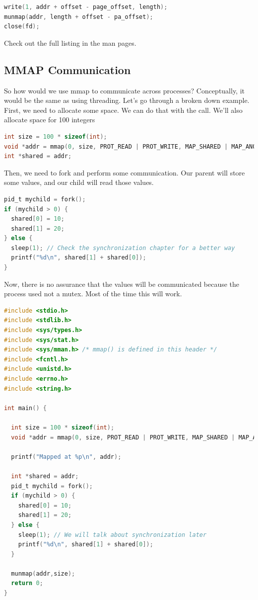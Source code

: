\begin{lstlisting}[language=C]
write(1, addr + offset - page_offset, length);
munmap(addr, length + offset - pa_offset);
close(fd);
\end{lstlisting}

Check out the full listing in the man pages.

\subsection{MMAP Communication}

So how would we use mmap to communicate across processes?
Conceptually, it would be the same as using threading.
Let's go through a broken down example.
First, we need to allocate some space.
We can do that with the  call.
We'll also allocate space for 100 integers

\begin{lstlisting}[language=C]
int size = 100 * sizeof(int);
void *addr = mmap(0, size, PROT_READ | PROT_WRITE, MAP_SHARED | MAP_ANONYMOUS, -1, 0);
int *shared = addr;
\end{lstlisting}

Then, we need to fork and perform some communication.
Our parent will store some values, and our child will read those values.

\begin{lstlisting}[language=C]
pid_t mychild = fork();
if (mychild > 0) {
  shared[0] = 10;
  shared[1] = 20;
} else {
  sleep(1); // Check the synchronization chapter for a better way
  printf("%d\n", shared[1] + shared[0]);
}
\end{lstlisting}

Now, there is no assurance that the values will be communicated because the process used  not a mutex.
Most of the time this will work.

\begin{lstlisting}[language=C]
#include <stdio.h>
#include <stdlib.h>
#include <sys/types.h>
#include <sys/stat.h>
#include <sys/mman.h> /* mmap() is defined in this header */
#include <fcntl.h>
#include <unistd.h>
#include <errno.h>
#include <string.h>

int main() {

  int size = 100 * sizeof(int);
  void *addr = mmap(0, size, PROT_READ | PROT_WRITE, MAP_SHARED | MAP_ANONYMOUS, -1, 0);

  printf("Mapped at %p\n", addr);

  int *shared = addr;
  pid_t mychild = fork();
  if (mychild > 0) {
    shared[0] = 10;
    shared[1] = 20;
  } else {
    sleep(1); // We will talk about synchronization later
    printf("%d\n", shared[1] + shared[0]);
  }

  munmap(addr,size);
  return 0;
}
\end{lstlisting}

